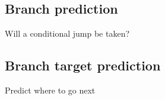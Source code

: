 
\subsection{Branch prediction}

Will a conditional jump be taken?

\subsection{Branch target prediction}

Predict where to go next


